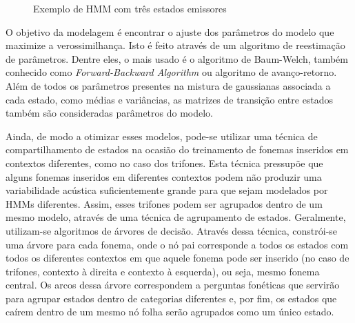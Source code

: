 \documentclass[12pt,a4paper,oneside]{report}
\begin{document}
\begin{figure}[h!]
\centering
{}\caption{Exemplo de HMM com três estados emissores}
\label{fig:exemploHMM}
\end{figure}

O objetivo da modelagem é encontrar o ajuste dos parâmetros do modelo que maximize a verossimilhança. Isto é feito através de um algoritmo de reestimação de parâmetros. Dentre eles, o mais usado é o algoritmo de Baum-Welch, também conhecido como \emph{Forward-Backward Algorithm} ou algoritmo de avanço-retorno.
Além de todos os parâmetros presentes na mistura de gaussianas associada a cada estado, como médias e variâncias, as matrizes de transição entre estados também são consideradas parâmetros do modelo.

Ainda, de modo a otimizar esses modelos, pode-se utilizar uma técnica de compartilhamento de estados na ocasião do treinamento de fonemas inseridos em contextos diferentes, como no caso dos trifones. Esta técnica pressupõe que alguns fonemas inseridos em diferentes contextos podem não produzir uma variabilidade acústica suficientemente grande para que sejam modelados por HMMs diferentes. Assim, esses trifones podem ser agrupados dentro de um mesmo modelo, através de uma técnica de agrupamento de estados. Geralmente, utilizam-se algoritmos de árvores de decisão.
Através dessa técnica, constrói-se uma árvore para cada fonema, onde o nó pai corresponde a todos os estados com todos os diferentes contextos em que aquele fonema pode ser inserido (no caso de trifones, contexto à direita e contexto à esquerda), ou seja, mesmo fonema central. Os arcos dessa árvore correspondem a perguntas fonéticas que servirão para agrupar estados dentro de categorias diferentes e, por fim, os estados que caírem dentro de um mesmo nó folha serão agrupados como um único estado.
\end{document}
